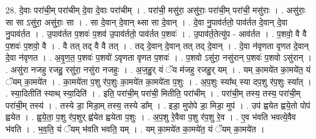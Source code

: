 \documentclass[17pt]{extarticle}
\begin{document}
28. दे॒वाः परा॑ची॒म् परा॑चीम् दे॒वा दे॒वाः परा॑चीम् । . परा॑ची॒ मसु॑रा॒ असु॑राः॒ परा॑ची॒म् परा॑ची॒ मसु॑राः । . असु॑राः॒ सा सा ऽसु॑रा॒ असु॑राः॒ सा । . सा दे॒वान् दे॒वान् थ्सा सा दे॒वान् । . दे॒वा नु॒पाव॑र्ततो॒ पाव॑र्तत दे॒वान् दे॒वा नु॒पाव॑र्तत । . उ॒पाव॑र्तत प॒शवः॑ प॒शव॑ उ॒पाव॑र्ततो॒ पाव॑र्तत प॒शवः॑ । . उ॒पाव॑र्त॒तेत्यु॑प - आव॑र्तत । . प॒शवो॒ वै वै प॒शवः॑ प॒शवो॒ वै । . वै तत् तद् वै वै तत् । . तद् दे॒वान् दे॒वान् तत् तद् दे॒वान् । . दे॒वा न॑वृणता वृणत दे॒वान् दे॒वा न॑वृणत । . अ॒वृ॒ण॒त॒ प॒शवः॑ प॒शवो॑ ऽवृणता वृणत प॒शवः॑ । . प॒शवो ऽसु॑रा॒ नसु॑रान् प॒शवः॑ प॒शवो ऽसु॑रान् । . असु॑रा नजहु रजहु॒ रसु॑रा॒ नसु॑रा नजहुः । . अ॒ज॒हु॒र् यं ॅय म॑जहु रजहु॒र् यम् । . यम् का॒मये॑त का॒मये॑त॒ यं ॅयम् का॒मये॑त । . का॒मये॑ता प॒शु र॑प॒शुः का॒मये॑त का॒मये॑ता प॒शुः । . अ॒प॒शुः स्या᳚थ् स्या दप॒शु र॑प॒शुः स्या᳚त् । . स्या॒दितीति॑ स्याथ् स्या॒दिति॑ । . इति॒ परा॑ची॒म् परा॑ची॒ मितीति॒ परा॑चीम् । . परा॑ची॒म् तस्य॒ तस्य॒ परा॑ची॒म् परा॑ची॒म् तस्य॑ । . तस्ये डा॒ मिडा॒म् तस्य॒ तस्ये डा᳚म् । . इडा॒ मुपोपे डा॒ मिडा॒ मुप॑ । . उप॑ ह्वयेत ह्वये॒तो पोप॑ ह्वयेत । . ह्व॒ये॒ता॒ प॒शु र॑प॒शुर् ह्व॑येत ह्वयेता प॒शुः । . अ॒प॒शु रे॒वैवा प॒शु र॑प॒शु रे॒व । . ए॒व भ॑वति भवत्ये॒वैव भ॑वति । . भ॒व॒ति॒ यं ॅयम् भ॑वति भवति॒ यम् । . यम् का॒मये॑त का॒मये॑त॒ यं ॅयम् का॒मये॑त । \newline
\end{document}
